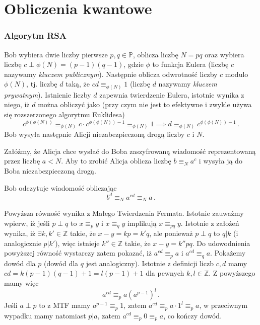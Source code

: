 \documentclass{myclass}
\begin{document}
\section{Obliczenia kwantowe}

\subsubsection*{Algorytm RSA}

Bob wybiera dwie liczby pierwsze \(p,q\in\mathbb{P}\), oblicza liczbę \(N = pq\) oraz wybiera liczbę
\(c \perp \phi(N) = (p-1)(q-1)\), gdzie \(\phi\) to funkcja Eulera (liczbę \(c\) nazywamy
\textit{kluczem publicznym}). Następnie oblicza odwrotność liczby \(c\) modulo \(\phi(N)\), tj.
liczbę \(d\) taką, że \(cd \equiv_{\phi(N)} 1\) (liczbę \(d\) nazywamy \textit{kluczem prywatnym}).
Istnienie liczby \(d\) zapewnia twierdzenie Eulera, istotnie wynika z niego, iż \(d\) można obliczyć
jako (przy czym nie jest to efektywne i zwykle używa się rozszerzonego algorytmu Euklidesa)
\begin{equation*}
    c^{\phi(\phi(N))} \equiv_{\phi(N)} c\cdot c^{\phi(\phi(N))-1} \equiv_{\phi(N)} 1  \implies d \equiv_{\phi(N)} c^{\phi(\phi(N))-1}\,.
\end{equation*}
Bob wysyła następnie Alicji niezabezpieczoną drogą liczby \(c\) i \(N\). 

Załóżmy, że Alicja chce wysłać do Boba zaszyfrowaną wiadomość reprezentowaną przez liczbę \(a < N\).
Aby to zrobić Alicja oblicza liczbę \(b \equiv_N a^c\) i wysyła ją do Boba niezabezpieczoną drogą.

Bob odczytuje wiadomość obliczając
\begin{equation*}
    b^d \equiv_N a^{cd} \equiv_N a\,.
\end{equation*}

Powyższa równość wynika z Małego Twierdzenia Fermata. Istotnie zauważmy wpierw, iż jeśli \(p \perp
q\) to \(x \equiv_p y\) i \(x \equiv_q y\) implikują \(x \equiv_{pq} y\). Istotnie z założeń wynika,
iż \(\exists k,k' \in \mathbb{Z}\) takie, że \(x - y = kp = k'q\), ale ponieważ \(p \perp q\) to \(q
| k\) (i analogicznie \(p | k'\)), więc istnieje \(k'' \in \mathbb{Z}\) takie, że \(x - y = k''
pq\). Do udowodnienia powyższej równość wystarczy zatem pokazać, iż \(a^{cd} \equiv_p a\) i \(a^{cd}
\equiv_q  a\). Pokażemy dowód dla \(p\) (dowód dla \(q\) jest analogiczny). Istotnie z definicji
liczb \(c,d\) mamy \(cd = k(p-1)(q-1) + 1 = l(p-1) + 1\) dla pewnych \(k,l\in\mathbb{Z}\). Z
powyższego mamy więc
\begin{equation*}
    a^{cd} \equiv_p a(a^{p-1})^l\,.
\end{equation*}
Jeśli \(a \perp p\) to z MTF mamy \(a^{p-1} \equiv_p 1\), zatem \(a^{cd} \equiv_p a\cdot1^l \equiv_p
a\), w przeciwnym wypadku mamy natomiast \(p | a\), zatem \(a^{cd} \equiv_p 0 \equiv_p a\), co
kończy dowód.
\end{document}
